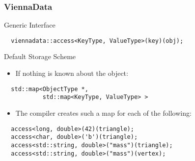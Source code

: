 

\begin{frame}[fragile]
\frametitle{ViennaData}

 \begin{block}{Generic Interface}
\begin{lstlisting}
  viennadata::access<KeyType, ValueType>(key)(obj);
\end{lstlisting} 
 \end{block}


 \begin{block}{Default Storage Scheme}
  \begin{itemize}
   \item If nothing is known about the object:
  \end{itemize}
  
\begin{lstlisting}
  std::map<ObjectType *,
           std::map<KeyType, ValueType> >
\end{lstlisting} 

  \begin{itemize}
   \item The compiler creates such a map for each of the following:
  \end{itemize}

\begin{lstlisting}
  access<long, double>(42)(triangle);
  access<char, double>('b')(triangle);
  access<std::string, double>("mass")(triangle);
  access<std::string, double>("mass")(vertex);
\end{lstlisting} 
 \end{block}

\end{frame}


